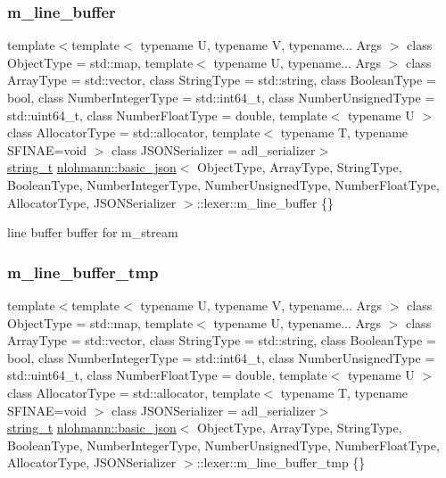 \subsubsection{\texorpdfstring{m\+\_\+line\+\_\+buffer}{m\_line\_buffer}}
{\footnotesize\ttfamily template$<$template$<$ typename U, typename V, typename... Args $>$ class Object\+Type = std\+::map, template$<$ typename U, typename... Args $>$ class Array\+Type = std\+::vector, class String\+Type  = std\+::string, class Boolean\+Type  = bool, class Number\+Integer\+Type  = std\+::int64\+\_\+t, class Number\+Unsigned\+Type  = std\+::uint64\+\_\+t, class Number\+Float\+Type  = double, template$<$ typename U $>$ class Allocator\+Type = std\+::allocator, template$<$ typename T, typename S\+F\+I\+N\+A\+E=void $>$ class J\+S\+O\+N\+Serializer = adl\+\_\+serializer$>$ \\
\hyperlink{classnlohmann_1_1basic__json_a61f8566a1a85a424c7266fb531dca005}{string\+\_\+t} \hyperlink{classnlohmann_1_1basic__json}{nlohmann\+::basic\+\_\+json}$<$ Object\+Type, Array\+Type, String\+Type, Boolean\+Type, Number\+Integer\+Type, Number\+Unsigned\+Type, Number\+Float\+Type, Allocator\+Type, J\+S\+O\+N\+Serializer $>$\+::lexer\+::m\+\_\+line\+\_\+buffer \{\}\hspace{0.3cm}{\ttfamily [private]}}



line buffer buffer for m\+\_\+stream 

\mbox{\label{classnlohmann_1_1basic__json_1_1lexer_a6cab4622ed1fb6525a11e86ef789581d}} 
\subsubsection{\texorpdfstring{m\+\_\+line\+\_\+buffer\+\_\+tmp}{m\_line\_buffer\_tmp}}
{\footnotesize\ttfamily template$<$template$<$ typename U, typename V, typename... Args $>$ class Object\+Type = std\+::map, template$<$ typename U, typename... Args $>$ class Array\+Type = std\+::vector, class String\+Type  = std\+::string, class Boolean\+Type  = bool, class Number\+Integer\+Type  = std\+::int64\+\_\+t, class Number\+Unsigned\+Type  = std\+::uint64\+\_\+t, class Number\+Float\+Type  = double, template$<$ typename U $>$ class Allocator\+Type = std\+::allocator, template$<$ typename T, typename S\+F\+I\+N\+A\+E=void $>$ class J\+S\+O\+N\+Serializer = adl\+\_\+serializer$>$ \\
\hyperlink{classnlohmann_1_1basic__json_a61f8566a1a85a424c7266fb531dca005}{string\+\_\+t} \hyperlink{classnlohmann_1_1basic__json}{nlohmann\+::basic\+\_\+json}$<$ Object\+Type, Array\+Type, String\+Type, Boolean\+Type, Number\+Integer\+Type, Number\+Unsigned\+Type, Number\+Float\+Type, Allocator\+Type, J\+S\+O\+N\+Serializer $>$\+::lexer\+::m\+\_\+line\+\_\+buffer\+\_\+tmp \{\}\hspace{0.3cm}{\ttfamily [private]}}



